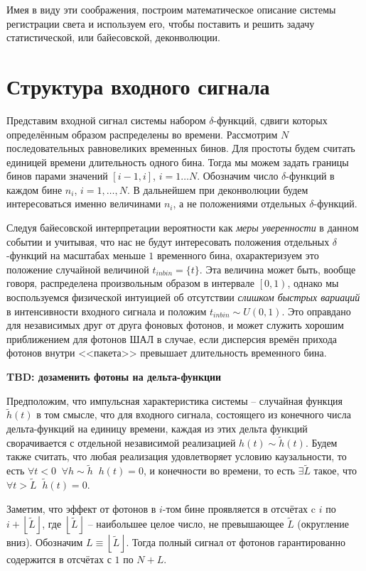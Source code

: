 \documentclass[12pt]{book}
\begin{document}
	Имея в виду эти соображения, построим математическое описание системы регистрации света и используем его, чтобы поставить и решить задачу статистической, или байесовской, деконволюции.
	
	\section{Структура входного сигнала}

	Представим входной сигнал системы набором $\delta$-функций, сдвиги которых определённым образом распределены во времени. Рассмотрим $N$ последовательных равновеликих временных бинов. Для простоты будем считать единицей времени длительность одного бина. Тогда мы можем задать границы бинов парами значений $[i-1, i]$, $i = 1 \ldots N$. Обозначим число $\delta$-функций в каждом бине $n_i$, $i = 1, \ldots, N$. В дальнейшем при деконволюции будем интересоваться именно величинами $n_i$, а не положениями отдельных $\delta$-функций.

	Следуя байесовской интерпретации вероятности как \textit{меры уверенности} в данном событии и учитывая, что нас не будут интересовать положения отдельных $\delta$-функций на масштабах меньше $1$ временного бина, охарактеризуем это положение случайной величиной $t_{inbin} = \{ t \}$. Эта величина может быть, вообще говоря, распределена произвольным образом в интервале $\left[0, 1\right)$, однако мы воспользуемся физической интуицией об отсутствии \textit{слишком быстрых вариаций} в интенсивности входного сигнала и положим $t_{inbin} \sim U(0, 1)$. Это оправдано для независимых друг от друга фоновых фотонов, и может служить хорошим приближением для фотонов ШАЛ в случае, если дисперсия времён прихода фотонов внутри <<пакета>> превышает длительность временного бина.
	
	\textbf{TBD: дозаменить фотоны на дельта-функции}

	Предположим, что импульсная характеристика системы -- случайная функция $\tilde{h}(t)$ в том смысле, что для входного сигнала, состоящего из конечного числа дельта-функций на единицу времени, каждая из этих дельта функций сворачивается с отдельной независимой реализацией $h(t) \sim \tilde{h}(t)$. Будем также считать, что любая реализация удовлетворяет условию каузальности, то есть $\forall t < 0 \; \; \forall h \sim \tilde{h} \; \; h(t) = 0$, и конечности во времени, то есть $\exists \tilde{L}$ такое, что $\forall t > \tilde{L} \; \; \tilde{h}(t) = 0$.

	Заметим, что эффект от фотонов в $i$-том бине проявляется в отсчётах c $i$ по $i + \left \lfloor{\tilde{L}}\right \rfloor$, где $\left \lfloor{\tilde{L}}\right \rfloor$ -- наибольшее целое число, не превышающее $\tilde{L}$ (округление вниз). Обозначим $L \equiv \left \lfloor{\tilde{L}}\right \rfloor$. Тогда полный сигнал от фотонов гарантированно содержится в отсчётах с $1$ по $N + L$.
	
\end{document}
